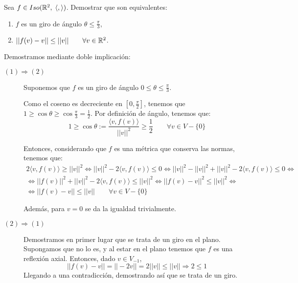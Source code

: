 \begin{ejercicio}
    Sea $f\in Iso(\mathbb{R}^2,\; \langle,\rangle)$. Demostrar que son equivalentes:
    \begin{enumerate}
        \item $f$ es un giro de ángulo $\theta \leq \frac{\pi}{3}$,
        \item $||f(v)-v|| \leq ||v|| \qquad \forall v\in \mathbb{R}^2$.
    \end{enumerate}



    Demostramos mediante doble implicación:
    \begin{description}
        \item [$(1) \Longrightarrow (2)$]
         Suponemos que $f$ es un giro de ángulo $0\leq \theta\leq \frac{\pi}{3}$.
         
         Como el coseno es decreciente en $\left[0,\frac{\pi}{2}\right]$, tenemos que $1 \geq \cos \theta \geq \cos \frac{\pi}{3}=\frac{1}{2}$. Por definición de ángulo, tenemos que:
         \begin{equation*}
             1 \geq \cos \theta := \frac{\langle v,f(v)\rangle}{||v||^2} \geq \frac{1}{2} \qquad \forall v\in V-\{0\}
         \end{equation*}

         Entonces, considerando que $f$ es una métrica que conserva las normas, tenemos que:
         \begin{multline*}
             2\langle v,f(v)\rangle \geq ||v||^2
             \Longleftrightarrow
             ||v||^2 -2\langle v,f(v)\rangle \leq 0
             \Longleftrightarrow
             ||v||^2 - ||v||^2 + ||v||^2 -2\langle v,f(v)\rangle \leq 0
             \Longleftrightarrow \\ \Longleftrightarrow
             ||f(v)||^2 + ||v||^2 -2\langle v,f(v)\rangle \leq ||v||^2
             \Longleftrightarrow
             ||f(v)-v||^2 \leq ||v||^2
             \Longleftrightarrow \\ \Longleftrightarrow
             ||f(v)-v|| \leq ||v|| \qquad \forall v\in V-\{0\}
         \end{multline*}

         Además, para $v=0$ se da la igualdad trivialmente.
        
        
        \item [$(2) \Longrightarrow (1)$]

        Demostramos en primer lugar que se trata de un giro en el plano. Supongamos que no lo es, y al estar en el plano tenemos que $f$ es una reflexión axial. Entonces, dado $v\in V_{-1}$,
        \begin{equation*}
            ||f(v)-v|| = ||-2v|| = 2||v||\leq ||v|| \Longrightarrow 2\leq 1
        \end{equation*}
        Llegando a una contradicción, demostrando así que se trata de un giro.


\end{description}
\end{ejercicio}
